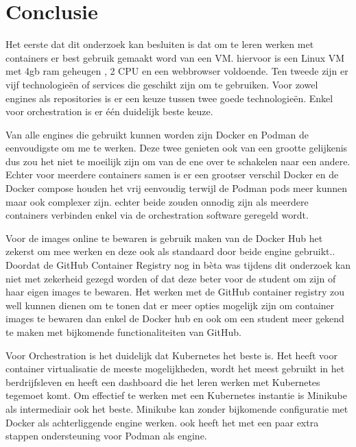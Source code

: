 
\chapter{Conclusie}
\label{ch:conclusie}



Het eerste dat dit onderzoek kan besluiten is dat om te leren werken met containers er best gebruik gemaakt word van een VM. hiervoor is een Linux VM met 4gb ram geheugen , 2 CPU en een webbrowser voldoende. Ten tweede zijn er vijf technologieën of services die geschikt zijn om te gebruiken. Voor zowel engines als repositories is er een keuze tussen twee goede technologieën. Enkel voor orchestration is er één duidelijk beste keuze. 

Van alle engines die gebruikt kunnen worden zijn Docker en Podman de eenvoudigste om me te werken. Deze twee genieten ook van een grootte gelijkenis dus zou het niet te moeilijk zijn om van de ene over te schakelen naar een andere. Echter voor meerdere containers samen is er een grootser verschil Docker en de Docker compose houden het vrij eenvoudig terwijl de Podman pods meer kunnen maar ook complexer zijn. echter beide zouden onnodig zijn als meerdere containers verbinden enkel via de orchestration software geregeld wordt.

Voor de images online te bewaren is gebruik maken van de Docker Hub het zekerst om mee werken en deze ook als standaard door beide engine gebruikt.. Doordat de GitHub Container Registry nog in bèta was tijdens dit onderzoek kan niet met zekerheid gezegd worden of dat deze beter voor de student om zijn of haar eigen images te bewaren. Het werken met de GitHub container registry zou well kunnen dienen om te tonen dat er meer opties mogelijk zijn om container images te bewaren dan enkel de Docker hub en ook om een student meer gekend te maken met bijkomende functionaliteiten van GitHub. 

Voor Orchestration is het duidelijk dat Kubernetes het beste is. Het heeft voor container virtualisatie de meeste mogelijkheden, wordt het meest gebruikt in het berdrijfsleven en heeft een dashboard die het leren werken met Kubernetes tegemoet komt. Om effectief te werken met een Kubernetes instantie is Minikube als intermediair ook het beste. Minikube kan zonder bijkomende configuratie met Docker als achterliggende engine werken. ook heeft het met een paar extra stappen ondersteuning voor Podman als engine.



